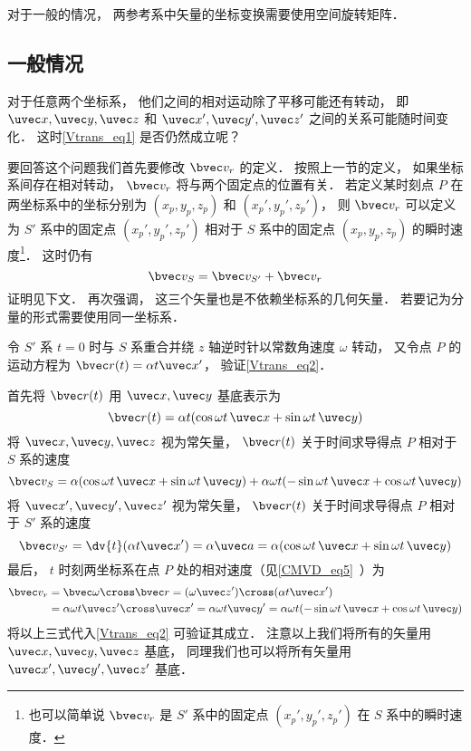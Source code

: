 对于一般的情况， 两参考系中矢量的坐标变换需要使用空间旋转矩阵．

\subsection{一般情况}
对于任意两个坐标系， 他们之间的相对运动除了平移可能还有转动， 即 $\uvec x, \uvec y, \uvec z$ 和 $\uvec x', \uvec y', \uvec z'$ 之间的关系可能随时间变化． 这时\autoref{Vtrans_eq1} 是否仍然成立呢？

要回答这个问题我们首先要修改 $\bvec v_r$ 的定义． 按照上一节的定义， 如果坐标系间存在相对转动， $\bvec v_r$ 将与两个固定点的位置有关． 若定义某时刻点 $P$ 在两坐标系中的坐标分别为 $(x_p, y_p, z_p)$ 和 $(x_p', y_p', z_p')$， 则 $\bvec v_r$ 可以定义为 $S'$ 系中的固定点 $(x_p', y_p', z_p')$ 相对于 $S$ 系中的固定点 $(x_p, y_p, z_p)$ 的瞬时速度\footnote{也可以简单说 $\bvec v_r$ 是 $S'$ 系中的固定点 $(x_p', y_p', z_p')$ 在 $S$ 系中的瞬时速度．}． 这时仍有
\begin{equation}\label{Vtrans_eq2}
\bvec v_{S} = \bvec v_{S'} + \bvec v_r
\end{equation}
证明见下文． 再次强调， 这三个矢量也是不依赖坐标系的几何矢量． 若要记为分量的形式需要使用同一坐标系．

\begin{example}{}\label{Vtrans_ex1}
令 $S'$ 系 $t = 0$ 时与 $S$ 系重合并绕 $z$ 轴逆时针以常数角速度 $\omega$ 转动， 又令点 $P$ 的运动方程为 $\bvec r(t) = \alpha t \uvec x'$， 验证\autoref{Vtrans_eq2}．

首先将 $\bvec r(t)$ 用 $\uvec x, \uvec y$ 基底表示为
\begin{equation}
\bvec r(t) = \alpha t (\cos\omega t\, \uvec x + \sin\omega t\, \uvec y)
\end{equation}
将 $\uvec x, \uvec y, \uvec z$ 视为常矢量， $\bvec r(t)$ 关于时间求导得点 $P$ 相对于 $S$ 系的速度
\begin{equation}
\bvec v_S = \alpha (\cos\omega t \,\uvec x + \sin\omega t \,\uvec y)
+ \alpha\omega t (-\sin\omega t \,\uvec x + \cos\omega t \,\uvec y)
\end{equation}
将 $\uvec x', \uvec y', \uvec z'$ 视为常矢量， $\bvec r(t)$ 关于时间求导得点 $P$ 相对于 $S'$ 系的速度
\begin{equation}
\bvec v_{S'} = \dv{t} (\alpha t \uvec x') = \alpha \uvec a = \alpha (\cos\omega t\, \uvec x + \sin\omega t \,\uvec y)
\end{equation}
最后， $t$ 时刻两坐标系在点 $P$ 处的相对速度（见\autoref{CMVD_eq5}~）为
\begin{equation}\label{Vtrans_eq3}
\begin{aligned}
\bvec v_r &= \bvec\omega \cross \bvec r = (\omega \uvec z') \cross (\alpha t \uvec x') \\
&= \alpha\omega t \uvec z'\cross\uvec x' = \alpha\omega t \uvec y' = \alpha\omega t(-\sin \omega t \,\uvec x + \cos\omega t \,\uvec y)
\end{aligned}
\end{equation}
将以上三式代入\autoref{Vtrans_eq2} 可验证其成立． 注意以上我们将所有的矢量用 $\uvec x, \uvec y, \uvec z$ 基底， 同理我们也可以将所有矢量用 $\uvec x', \uvec y', \uvec z'$ 基底．
\end{example}

